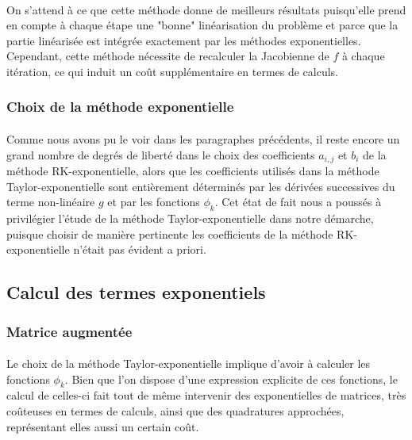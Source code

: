         \paragraph{}
        On s'attend à ce que cette méthode donne de meilleurs résultats puisqu'elle prend en compte à chaque étape une "bonne" linéarisation du problème et parce que la partie linéarisée est intégrée exactement par les méthodes exponentielles. Cependant, cette méthode nécessite de recalculer la Jacobienne de $f$ à chaque itération, ce qui induit un coût supplémentaire en termes de calculs.

    \subsubsection{Choix de la méthode exponentielle}
        \paragraph{}
        Comme nous avons pu le voir dans les paragraphes précédents, il reste encore un grand nombre de degrés de liberté dans le choix des coefficients $a_{i,j}$ et $b_i$ de la méthode RK-exponentielle, alors que les coefficients utilisés dans la méthode Taylor-exponentielle sont entièrement déterminés par les dérivées successives du terme non-linéaire $g$ et par les fonctions $\phi_k$. Cet état de fait nous a poussés à privilégier l'étude de la méthode Taylor-exponentielle dans notre démarche, puisque choisir de manière pertinente les coefficients de la méthode RK-exponentielle n'était pas évident a priori.


\subsection{Calcul des termes exponentiels}

    \subsubsection{Matrice augmentée}
        \paragraph{}
        Le choix de la méthode Taylor-exponentielle implique d'avoir à calculer les fonctions $\phi_k$. Bien que l'on dispose d'une expression explicite de ces fonctions, le calcul de celles-ci fait tout de même intervenir des exponentielles de matrices, très coûteuses en termes de calculs, ainsi que des quadratures approchées, représentant elles aussi un certain coût.

